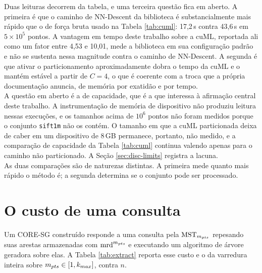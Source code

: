 Duas leituras decorrem da tabela, e uma terceira questão fica em aberto. A primeira é que o caminho de NN-Descent da biblioteca é substancialmente mais rápido que o de força bruta usado na Tabela \ref{tab:cuml}: 17,2\,s contra 43,6\,s em $5 \times 10^5$ pontos. A vantagem em tempo deste trabalho sobre a cuML, reportada ali como um fator entre 4,53 e 10,01, mede a biblioteca em sua configuração padrão e não se sustenta nessa magnitude contra o caminho de NN-Descent. A segunda é que ativar o particionamento aproximadamente dobra o tempo da cuML e o mantém estável a partir de $C = 4$, o que é coerente com a troca que a própria documentação anuncia, de memória por exatidão e por tempo.\\

A questão em aberto é a de capacidade, que é a que interessa à afirmação central deste trabalho. A instrumentação de memória de dispositivo não produziu leitura nessas execuções, e os tamanhos acima de $10^6$ pontos não foram medidos porque o conjunto \texttt{sift1m} não os contém. O tamanho em que a cuML particionada deixa de caber em um dispositivo de 8\,GB permanece, portanto, não medido, e a comparação de capacidade da Tabela \ref{tab:cuml} continua valendo apenas para o caminho não particionado. A Seção \ref{sec:disc-limits} registra a lacuna.\\

As duas comparações são de naturezas distintas. A primeira mede quanto mais rápido o método é; a segunda determina se o conjunto pode ser processado.\\

\section{O custo de uma consulta\label{sec:res-extract}}

Um \ac{CORE-SG} construído responde a uma consulta pela $\mathrm{MST}_{m_{pts}}$ repesando suas arestas armazenadas com $\mathrm{mrd}^{m_{pts}}$ e executando um algoritmo de árvore geradora sobre elas. A Tabela \ref{tab:extract} reporta esse custo e o da varredura inteira sobre $m_{pts} \in [1, k_{max}]$, contra $n$.\\

